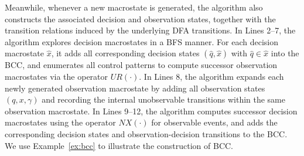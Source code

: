 \documentclass[final,5p,times,twocolumn,authoryear]{elsarticle}
\begin{document}
Meanwhile, whenever a new macrostate is generated, the algorithm also constructs the associated decision and observation states, together with the transition relations induced by the underlying DFA transitions.
%
In Lines 2--7, the algorithm explores decision macrostates in a BFS manner.
For each decision macrostate $\hat{x}$, it adds all corresponding decision states $(\hat{q}, \hat{x})$ with $\hat{q} \in \hat{x}$ into the BCC, and enumerates all control patterns to compute successor observation macrostates via the operator $UR(\cdot)$.
%
In Lines 8, the algorithm expands each newly generated observation macrostate by adding all observation states $(q, x, \gamma)$ and recording the internal unobservable transitions within the same observation macrostate.
%
In Lines 9--12, the algorithm computes successor decision macrostates using the operator $NX(\cdot)$ for observable events, and adds the corresponding decision states and observation-decision transitions to the BCC.
%
We use Example~\ref{ex:bcc} to illustrate the construction of BCC.
%
\end{document}
